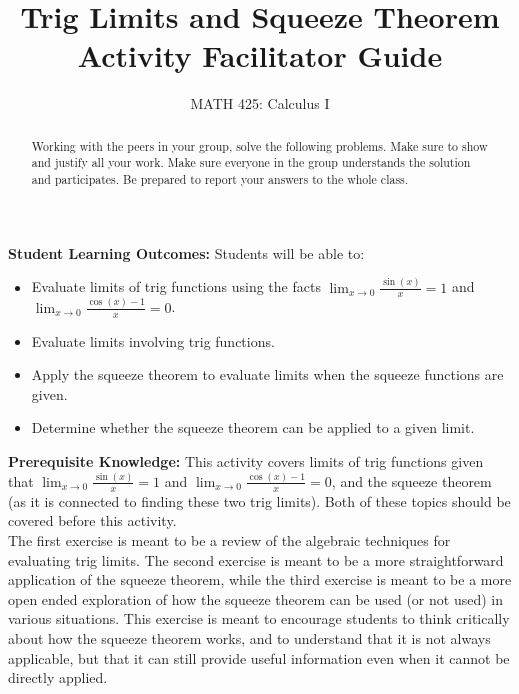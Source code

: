 \documentclass{ximera}
\title{Trig Limits and Squeeze Theorem Activity Facilitator Guide}
\author{MATH 425: Calculus I}
\begin{document}
\begin{abstract}
    Working with the peers in your group, solve the following problems. Make sure to show and justify all your work. Make sure everyone in the group understands the solution and participates. Be prepared to report your answers to the whole class. 
\end{abstract}
\maketitle

\textbf{Student Learning Outcomes:} 
 Students will be able to: 
    \begin{itemize}
        \item Evaluate limits of trig functions using the facts $\displaystyle\lim_{x\rightarrow 0}\frac{\sin(x)}{x}=1$ and $\lim_{x\rightarrow 0}\frac{\cos(x)-1}{x}=0$.
        \item Evaluate limits involving trig functions.
        \item Apply the squeeze theorem to evaluate limits when the squeeze functions are given.
        \item Determine whether the squeeze theorem can be applied to a given limit.
    \end{itemize}
\textbf{Prerequisite Knowledge:} This activity covers limits of trig functions given that $\displaystyle\lim_{x\rightarrow 0}\frac{\sin(x)}{x}=1$ and $\lim_{x\rightarrow 0}\frac{\cos(x)-1}{x}=0$, and the squeeze theorem (as it is connected to finding these two trig limits). Both of these topics should be covered before this activity.\\
The first exercise is meant to be a review of the algebraic techniques for evaluating trig limits.  The second exercise is meant to be a more straightforward application of the squeeze theorem, while the third exercise is meant to be a more open ended exploration of how the squeeze theorem can be used (or not used) in various situations.  This exercise is meant to encourage students to think critically about how the squeeze theorem works, and to understand that it is not always applicable, but that it can still provide useful information even when it cannot be directly applied.
\end{document}
